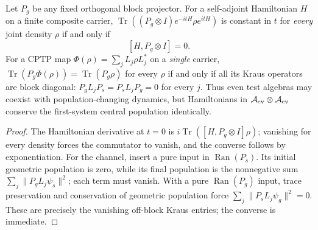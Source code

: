 \documentclass[12pt,a4paper]{article}
\begin{document}
\begin{proposition}
\label{p4:prop:v264-population-converse}
Let $P_g$ be any fixed orthogonal block projector. For a
self-adjoint Hamiltonian $H$ on a finite composite carrier,
$\operatorname{Tr}((P_g\otimes I)e^{-itH}\rho e^{itH})$
is constant in $t$ for \emph{every} joint density $\rho$ if and only if
\[
 \boxed{[H,P_g\otimes I]=0.}
\]
For a CPTP map $\Phi(\rho)=\sum_jL_j\rho L_j^*$ on a \emph{single}
carrier, $\operatorname{Tr}(P_g\Phi(\rho))=\operatorname{Tr}(P_g\rho)$
for every $\rho$ if and only if all its Kraus operators are block
diagonal: $P_gL_jP_s=P_sL_jP_g=0$ for every $j$.
Thus even test algebras may coexist with population-changing dynamics,
but Hamiltonians in $\mathcal A_{\rm ev}\otimes\mathcal A_{\rm ev}$
conserve the first-system central population identically.
\end{proposition}
\begin{proof}
The Hamiltonian derivative at $t=0$ is
$i\operatorname{Tr}([H,P_g\otimes I]\rho)$; vanishing for every
density forces the commutator to vanish, and the converse follows
by exponentiation. For the channel, insert a pure input in
$\operatorname{Ran}(P_s)$. Its initial geometric population is zero,
while its final population is the nonnegative sum
$\sum_j\|P_gL_j\psi_s\|^2$; each term must vanish. With a pure
$\operatorname{Ran}(P_g)$ input, trace preservation and conservation
of geometric population force
$\sum_j\|P_sL_j\psi_g\|^2=0$.
These are precisely the vanishing off-block Kraus entries; the
converse is immediate.
\end{proof}
\end{document}
